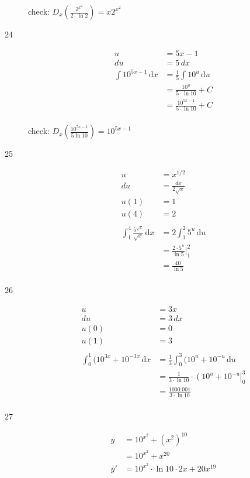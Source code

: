 \documentclass{exam}
\begin{document}
\begin{description}
check: $D_x \left( \frac{2^{x^2}}{2 \cdot \ln 2} \right) = x 2^{x^2}$

\item[24]
\begin{align*}
  u &= 5x - 1 \\
  du &= 5 \, dx
\\
  \int 10^{5x - 1} \, \mathrm{d}x &= \frac{1}{5} \int 10^u \, \mathrm{d}u \\
  &= \frac{10^u}{5 \cdot \ln 10} + C \\
  &= \frac{10^{5x - 1}}{5 \cdot \ln 10} + C \\
\end{align*}

check: $D_x \left( \frac{10^{5x - 1}}{5 \ln 10} \right) = 10^{5x - 1}$

\item[25]
\begin{align*}
  u &= x^{1/2} \\
  du &= \frac{dx}{2 \sqrt{x}} \\
  u(1) &= 1 \\
  u(4) &= 2 \\
\\
  \int_1^4 \frac{5^{\sqrt{x}}}{\sqrt{x}} \, \mathrm{d}x &= 2 \int_1^2 5^u \, \mathrm{d}u \\
  &= \frac{2 \cdot 5^u}{\ln 5} \bigg|_1^2 \\
  &= \frac{40}{\ln 5} \\
\end{align*}

\item[26]
\begin{align*}
  u &= 3x \\
  du &= 3 \, dx\\
  u(0) &= 0 \\
  u(1) &= 3 \\
\\
  \int_0^1 (10^{3x} + 10^{-3x} \, \mathrm{d}x &= \frac{1}{3} \int_0^3 (10^u + 10^{-u} \, \mathrm{d}u \\
  &= \frac{1}{3 \cdot \ln 10} \cdot \left(10^u + 10^{-u} \right|_0^3 \\
  &= \frac{1000.001}{3 \cdot \ln 10} \\
\end{align*}

\item[27]
\begin{align*}
  y &= 10^{x^2} + (x^2)^{10} \\
    &= 10^{x^2} + x^{20} \\
  y' &= 10^{x^2} \cdot \ln 10 \cdot 2x + 20x^{19} \\
\end{align*}


\end{description}
\end{document}
